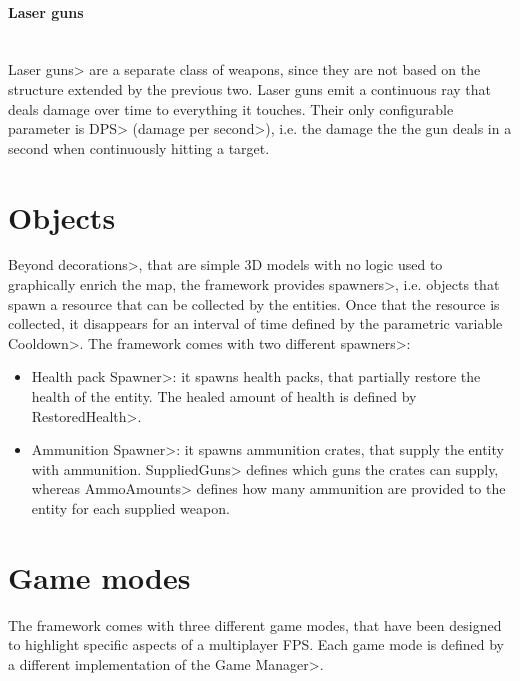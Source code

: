 \paragraph{Laser guns}

\mbox{}\\

{\setlength{\parindent}{0cm}
\<Laser guns> are a separate class of weapons, since they are not based on the structure extended by the previous two. Laser guns emit a continuous ray that deals damage over time to everything it touches. Their only configurable parameter is \<DPS> (\<damage per second>), i.e. the damage the the gun deals in a second when continuously hitting a target.
}


\section{Objects}

Beyond \<decorations>, that are simple 3D models with no logic used to graphically enrich the map, the framework provides \<spawners>, i.e. objects that spawn a resource that can be collected by the entities. Once that the resource is collected, it disappears for an interval  of time defined by the parametric variable  \<Cooldown>. The framework comes with two different \<spawners>:

\begin{itemize}
\item \<Health pack Spawner>: it spawns health packs, that partially restore the health of the entity. The healed amount of health is defined by \<RestoredHealth>.
\item \<Ammunition Spawner>: it spawns ammunition crates, that supply the entity with ammunition. \<SuppliedGuns> defines which guns the crates can supply, whereas \<AmmoAmounts> defines how many ammunition are provided to the entity for each supplied weapon.

\end{itemize}


\section{Game modes}

The framework comes with three different game modes, that have been designed to highlight specific aspects of a multiplayer FPS. Each game mode is defined by a different implementation of the \<Game Manager>.

